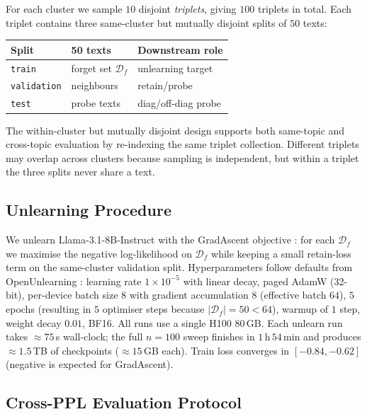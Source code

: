 \documentclass[11pt,a4paper]{article}
\newcommand{\Df}{\mathcal{D}_f}
\begin{document}
For each cluster we sample $10$ disjoint \emph{triplets}, giving $100$ triplets in total. Each triplet contains three same-cluster but mutually disjoint splits of $50$ texts:
\begin{center}
\small
\begin{tabular}{@{}lll@{}}
    \toprule
    Split & 50 texts & Downstream role \\
    \midrule
    \texttt{train}      & forget set $\Df$              & unlearning target \\
    \texttt{validation} & neighbours                    & retain/probe \\
    \texttt{test}       & probe texts                   & diag/off-diag probe \\
    \bottomrule
\end{tabular}
\end{center}
The within-cluster but mutually disjoint design supports both same-topic and
cross-topic evaluation by re-indexing the same triplet collection. Different
triplets may overlap across clusters because sampling is independent, but
within a triplet the three splits never share a text.

\subsection{Unlearning Procedure}
\label{sec:unlearn}

We unlearn Llama-3.1-8B-Instruct \citep{dubey2024llama3} with the GradAscent objective \citep{jang2023knowledge}: for each $\Df$ we maximise the negative log-likelihood on $\Df$ while keeping a small retain-loss term on the same-cluster validation split. Hyperparameters follow defaults from OpenUnlearning \citep{dorna2025openunlearning}: learning rate $1\!\times\!10^{-5}$ with linear decay, paged AdamW (32-bit), per-device batch size $8$ with gradient accumulation $8$ (effective batch $64$), $5$ epochs (resulting in $5$ optimiser steps because $|\Df|{=}50<64$), warmup of $1$ step, weight decay $0.01$, BF16. All runs use a single H100 80\,GB. Each unlearn run takes $\approx 75$\,s wall-clock; the full $n{=}100$ sweep finishes in $1$\,h\,$54$\,min and produces $\approx 1.5$\,TB of checkpoints ($\approx 15$\,GB each). Train loss converges in $[-0.84, -0.62]$ (negative is expected for GradAscent).

\subsection{Cross-PPL Evaluation Protocol}
\label{sec:matrix}
\end{document}
